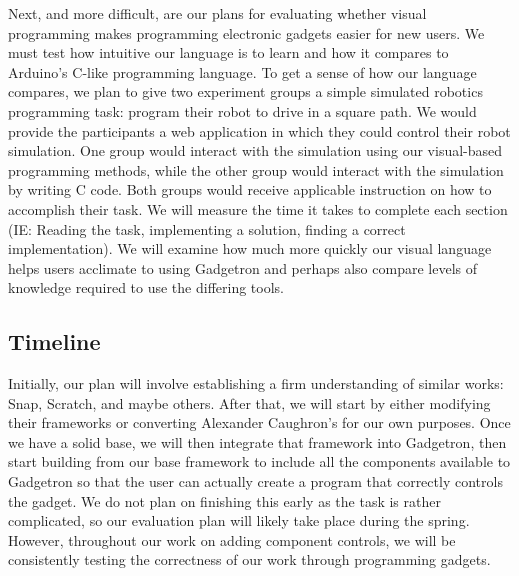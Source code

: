\documentclass[12pt]{article}
\begin{document}
Next, and more difficult, are our plans for evaluating whether visual programming makes programming electronic gadgets easier for new users. We must test how intuitive our language is to learn and how it compares to Arduino's C-like programming language. To get a sense of how our language compares, we plan to give two experiment groups a simple simulated robotics programming task: program their robot to drive in a square path. We would provide the participants a web application in which they could control their robot simulation. One group would interact with the simulation using our visual-based programming methods, while the other group would interact with the simulation by writing C code. Both groups would receive applicable instruction on how to accomplish their task. We will measure the time it takes to complete each section (IE: Reading the task, implementing a solution, finding a correct implementation). We will examine how much more quickly our visual language helps users acclimate to using Gadgetron and perhaps also compare levels of knowledge required to use the differing tools.

\subsection{Timeline}
Initially, our plan will involve establishing a firm understanding of similar works: Snap, Scratch, and maybe others. After that, we will start by either modifying their frameworks or converting Alexander Caughron's for our own purposes. Once we have a solid base, we will then integrate that framework into Gadgetron, then start building from our base framework to include all the components available to Gadgetron so that the user can actually create a program that correctly controls the gadget. We do not plan on finishing this early as the task is rather complicated, so our evaluation plan will likely take place during the spring. However, throughout our work on adding component controls, we will be consistently testing the correctness of our work through programming gadgets.



\end{document}
